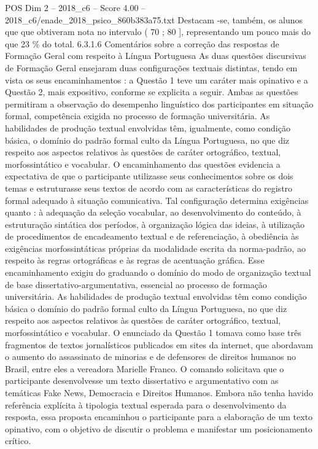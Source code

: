 \begin{textsample}{POS Dim 2 – 2018\_c6 – Score 4.00 – 2018\_c6/enade\_2018\_psico\_860b383a75.txt}
Destacam -se, também, os alunos que que obtiveram nota no intervalo ( 70 ; 80 ], representando um pouco mais do que 23 \% do total. 6.3.1.6 Comentários sobre a correção das respostas de Formação Geral com respeito à Língua Portuguesa As duas questões discursivas de Formação Geral ensejaram duas configurações textuais distintas, tendo em vista os seus encaminhamentos : a Questão 1 teve um caráter mais opinativo e a Questão 2, mais expositivo, conforme se explicita a seguir.
Ambas as questões permitiram a observação do desempenho linguístico dos participantes em situação formal, competência exigida no processo de formação universitária.
As habilidades de produção textual envolvidas têm, igualmente, como condição básica, o domínio do padrão formal culto da Língua Portuguesa, no que diz respeito aos aspectos relativos às questões de caráter ortográfico, textual, morfossintático e vocabular.
O encaminhamento das questões evidencia a expectativa de que o participante utilizasse seus conhecimentos sobre os dois temas e estruturasse seus textos de acordo com as características do registro formal adequado à situação comunicativa.
Tal configuração determina exigências quanto : à adequação da seleção vocabular, ao desenvolvimento do conteúdo, à estruturação sintática dos períodos, à organização lógica das ideias, à utilização de procedimentos de encadeamento textual e de referenciação, à obediência às exigências morfossintáticas próprias da modalidade escrita da norma-padrão, ao respeito às regras ortográficas e às regras de acentuação gráfica.
Esse encaminhamento exigiu do graduando o domínio do modo de organização textual de base dissertativo-argumentativa, essencial ao processo de formação universitária.
As habilidades de produção textual envolvidas têm como condição básica o domínio do padrão formal culto da Língua Portuguesa, no que diz respeito aos aspectos relativos às questões de caráter ortográfico, textual, morfossintático e vocabular.
O enunciado da Questão 1 tomava como base três fragmentos de textos jornalísticos publicados em sites da internet, que abordavam o aumento do assassinato de minorias e de defensores de direitos humanos no Brasil, entre eles a vereadora Marielle Franco.
O comando solicitava que o participante desenvolvesse um texto dissertativo e argumentativo com as temáticas Fake News, Democracia e Direitos Humanos.
Embora não tenha havido referência explícita à tipologia textual esperada para o desenvolvimento da resposta, essa proposta encaminhou o participante para a elaboração de um texto opinativo, com o objetivo de discutir o problema e manifestar um posicionamento crítico.

\end{textsample}

